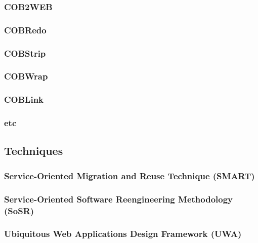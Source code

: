 \documentclass[12pt,journal,compsoc]{IEEEtran}
\begin{document}
\subsubsection{COB2WEB}
\label{subsubsec:cob2web}

\subsubsection{COBRedo}
\label{subsubsec:cobredo}

\subsubsection{COBStrip}
\label{subsubsec:cobstrip}

\subsubsection{COBWrap}
\label{subsubsec:cobwrap}

\subsubsection{COBLink}
\label{subsubsec:coblink}

\subsubsection{etc}

\subsection{Techniques}
\label{subsec:techniques}

\subsubsection{Service-Oriented Migration and Reuse Technique (SMART)}
\label{subsubsec:smart}

\subsubsection{Service-Oriented Software Reengineering Methodology (SoSR)}
\label{subsubsec:sosr}

\subsubsection{Ubiquitous Web Applications Design Framework (UWA)}
\label{subsubsec:uwa}
\end{document}
